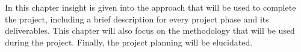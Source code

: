 In this chapter insight is given into the approach that will be used to complete the project, including a brief description for every project phase and its deliverables. This chapter will also focus on the methodology that will be used during the project. Finally, the project planning will be elucidated.

